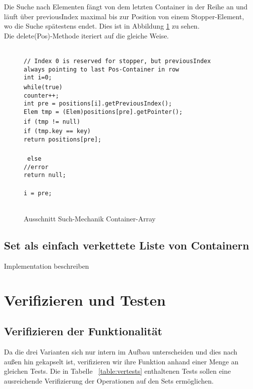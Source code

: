 \documentclass[11pt]{scrartcl}
\begin{document}
Die Suche nach Elementen fängt von dem letzten Container in der Reihe an und läuft über previousIndex maximal bis zur Position von einem Stopper-Element, wo die Suche spätestens endet. Dies ist in Abbildung \ref{figure:findmech} zu sehen.\\
Die delete(Pos)-Methode iteriert auf die gleiche Weise.
\begin{figure}[h!]
\texttt{ \\
// Index 0 is reserved for stopper, but previousIndex always pointing to last Pos-Container in row\\
int i=0;    \\
while(true) {\\
    counter++;\\
    int pre = positions[i].getPreviousIndex();\\
    Elem tmp = (Elem)positions[pre].getPointer();\\
    if (tmp != null) {\\
        if (tmp.key == key) {\\
            return positions[pre];\\
        }\\
    } else {\\
        //error\\
        return null;\\
    }\\
    i = pre;\\
}\\
}
\caption{Ausschnitt Such-Mechanik Container-Array}
\label{figure:findmech}
\end{figure}

\subsection{Set als einfach verkettete Liste von Containern}
\label{sec:setCon}

Implementation beschreiben

\section{Verifizieren und Testen}
\label{sec:vertests}

\subsection{Verifizieren der Funktionalität}
\label{sec:verfun}
Da die drei Varianten sich nur intern im Aufbau unterscheiden und dies nach außen hin gekapselt ist, verifizieren wir ihre Funktion anhand einer Menge an gleichen Tests.
Die in Tabelle ~\ref{table:vertests} enthaltenen Tests sollen eine ausreichende Verifizierung der Operationen auf den Sets ermöglichen.
\end{document}
